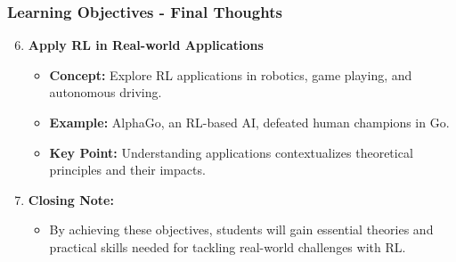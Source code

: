 \documentclass[aspectratio=169]{beamer}
\begin{document}
\begin{frame}[fragile]
  \frametitle{Learning Objectives - Final Thoughts}
  \begin{enumerate}
    \setcounter{enumi}{5}
    
    \item \textbf{Apply RL in Real-world Applications}
      \begin{itemize}
        \item \textbf{Concept:} Explore RL applications in robotics, game playing, and autonomous driving.
        \item \textbf{Example:} AlphaGo, an RL-based AI, defeated human champions in Go.
        \item \textbf{Key Point:} Understanding applications contextualizes theoretical principles and their impacts.
      \end{itemize}
    
    \item \textbf{Closing Note:}
      \begin{itemize}
        \item By achieving these objectives, students will gain essential theories and practical skills needed for tackling real-world challenges with RL.
      \end{itemize}
  \end{enumerate}
\end{frame}
\end{document}
